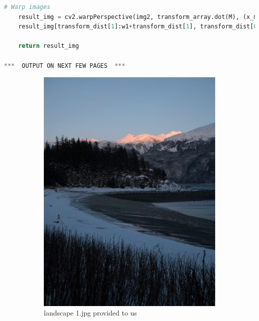 \documentclass{csc_assignment4}
\begin{document}
\begin{description}
\begin{enumerate}[label=(\alph*)]
\begin{lstlisting}[language=Python]
	# Warp images
	result_img = cv2.warpPerspective(img2, transform_array.dot(M), (x_max-x_min, y_max-y_min))
	result_img[transform_dist[1]:w1+transform_dist[1], transform_dist[0]:h1+transform_dist[0]] = img1

	return result_img
	
***  OUTPUT ON NEXT FEW PAGES  ***
\end{lstlisting}


\begin{figure}[h!]
  \centering
  \begin{subfigure}[b]{0.5\linewidth}
    \includegraphics[width=\linewidth]{data/landscape_1.jpg}
    \caption{landscape 1.jpg provided to us}
  \end{subfigure}
  \begin{subfigure}[b]{0.5\linewidth}

\end{subfigure}
\end{figure}
\end{enumerate}
\end{description}
\end{document}
